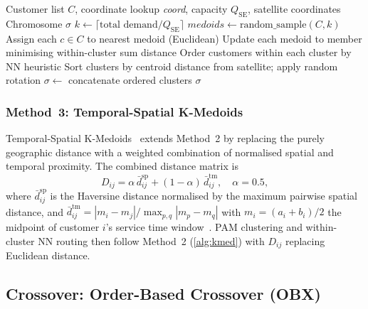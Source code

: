 \documentclass[11pt, a4paper]{article}
\newcommand{\QSE}{Q_{\mathrm{SE}}}
\numberwithin{equation}{section}
\begin{document}
\begin{algorithm}[ht]
\caption{Spatial K-Medoids initialization for one population slot}
\label{alg:kmed}
\begin{algorithmic}[1]
\Require Customer list $C$, coordinate lookup \textit{coord},
         capacity $\QSE$, satellite coordinates
\Ensure Chromosome $\sigma$
\State $k \leftarrow \lceil\text{total demand}/\QSE\rceil$
\State $\mathit{medoids}\leftarrow\mathrm{random\_sample}(C,k)$
\Repeat
  \State Assign each $c\in C$ to nearest medoid (Euclidean)
  \State Update each medoid to member minimising within-cluster sum distance
 
\State Order customers within each cluster by NN heuristic
\State Sort clusters by centroid distance from satellite; apply random rotation
\State $\sigma\leftarrow$ concatenate ordered clusters
\State \Return $\sigma$
\end{algorithmic}
\end{algorithm}

\subsubsection{Method~3: Temporal-Spatial K-Medoids}
\label{sec:init:tskmed}

Temporal-Spatial K-Medoids~\cite{ren2024} extends Method~2 by replacing the
purely geographic distance with a weighted combination of normalised spatial
and temporal proximity.  The combined distance matrix is
\begin{equation}
  D_{ij} = \alpha\,\bar{d}^{\mathrm{sp}}_{ij}
          +(1-\alpha)\,\bar{d}^{\mathrm{tm}}_{ij},\quad\alpha=0.5,
  \label{eq:ts_dist}
\end{equation}
where $\bar{d}^{\mathrm{sp}}_{ij}$ is the Haversine distance normalised by
the maximum pairwise spatial distance, and
$\bar{d}^{\mathrm{tm}}_{ij}=|m_i-m_j|/\max_{p,q}|m_p-m_q|$ with
$m_i=(a_i+b_i)/2$ the midpoint of customer $i$'s service time
window~\cite{ren2024}.  PAM clustering and within-cluster NN routing then
follow Method~2 (\cref{alg:kmed}) with $D_{ij}$ replacing Euclidean distance.

\subsection{Crossover: Order-Based Crossover (OBX)}
\end{document}
